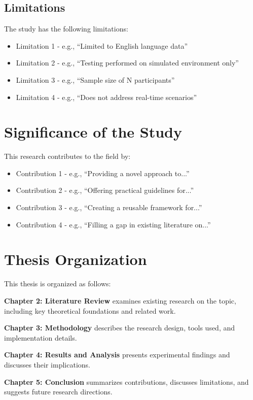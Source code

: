 \subsection{Limitations}
\label{subsec:limitations}

The study has the following limitations:
\begin{itemize}
    \item Limitation 1 - e.g., ``Limited to English language data''
    \item Limitation 2 - e.g., ``Testing performed on simulated environment only''
    \item Limitation 3 - e.g., ``Sample size of N participants''
    \item Limitation 4 - e.g., ``Does not address real-time scenarios''
\end{itemize}


\section{Significance of the Study}
\label{sec:significance}

This research contributes to the field by:

\begin{itemize}
    \item Contribution 1 - e.g., ``Providing a novel approach to...''
    \item Contribution 2 - e.g., ``Offering practical guidelines for...''
    \item Contribution 3 - e.g., ``Creating a reusable framework for...''
    \item Contribution 4 - e.g., ``Filling a gap in existing literature on...''
\end{itemize}


\section{Thesis Organization}
\label{sec:organization}

This thesis is organized as follows:

\textbf{Chapter 2: Literature Review} examines existing research on the topic, including key theoretical foundations and related work.

\textbf{Chapter 3: Methodology} describes the research design, tools used, and implementation details.

\textbf{Chapter 4: Results and Analysis} presents experimental findings and discusses their implications.

\textbf{Chapter 5: Conclusion} summarizes contributions, discusses limitations, and suggests future research directions.
